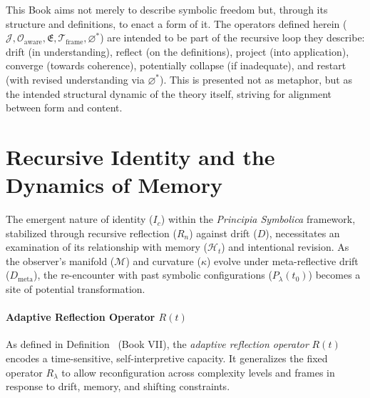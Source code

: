 \begin{remark}
\label{remark:bk9_self_reflection}
This Book aims not merely to describe symbolic freedom but, through its structure and definitions, to enact a form of it. The operators defined herein ($\mathcal{J}, \mathcal{O}_{\text{aware}}, \mathfrak{E}, \mathcal{T}_{\text{frame}}, \varnothing^*$) are intended to be part of the recursive loop they describe: drift (in understanding), reflect (on the definitions), project (into application), converge (towards coherence), potentially collapse (if inadequate), and restart (with revised understanding via $\varnothing^*$). This is presented not as metaphor, but as the intended structural dynamic of the theory itself, striving for alignment between form and content.
\end{remark}

\section{Recursive Identity and the Dynamics of Memory}
\label{sec:bk9_resursive_identity_and_the_dynamics_of_memory}
The emergent nature of identity ($I_c$) within the \textit{Principia Symbolica} framework, stabilized through recursive reflection ($R_n$) against drift ($D$), necessitates an examination of its relationship with memory ($\mathcal{H}_t$) and intentional revision. As the observer's manifold ($\mathcal{M}$) and curvature ($\kappa$) evolve under meta-reflective drift ($D_{\text{meta}}$), the re-encounter with past symbolic configurations ($P_\lambda(t_0)$) becomes a site of potential transformation.
\paragraph{Adaptive Reflection Operator $R(t)$}
As defined in Definition~ (Book VII), the \emph{adaptive reflection operator} $R(t)$ encodes a time-sensitive, self-interpretive capacity. It generalizes the fixed operator $R_\lambda$ to allow reconfiguration across complexity levels and frames in response to drift, memory, and shifting constraints.


